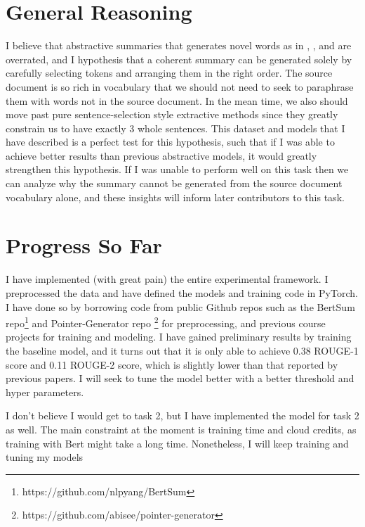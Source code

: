 \documentclass[11pt,a4paper]{article}
\begin{document}
\section{General Reasoning}
I believe that abstractive summaries that generates novel words as in \cite{pointer-generator}, \cite{lead}, and \cite{dca} are overrated, and I hypothesis that a coherent summary can be generated solely by carefully selecting tokens and arranging them in the right order. The source document is so rich in vocabulary that we should not need to seek to paraphrase them with words not in the source document. In the mean time, we also should move past pure sentence-selection style extractive methods since they greatly constrain us to have exactly 3 whole sentences. This dataset and models that I have described is a perfect test for this hypothesis, such that if I was able to achieve better results than previous abstractive models, it would greatly strengthen this hypothesis. If I was unable to perform well on this task then we can analyze why the summary cannot be generated from the source document vocabulary alone, and these insights will inform later contributors to this task.

\section{Progress So Far}
I have implemented (with great pain) the entire experimental framework. I preprocessed the data and have defined the models and training code in PyTorch. I have done so by borrowing code from public Github repos such as the BertSum repo\footnote{https://github.com/nlpyang/BertSum} and Pointer-Generator repo \footnote{https://github.com/abisee/pointer-generator} for preprocessing, and previous course projects for training and modeling. I have gained preliminary results by training the baseline model, and it turns out that it is only able to achieve 0.38 ROUGE-1 score and 0.11 ROUGE-2 score, which is slightly lower than that reported by previous papers. I will seek to tune the model better with a better threshold and hyper parameters.

I don't believe I would get to task 2, but I have implemented the model for task 2 as well. The main constraint at the moment is training time and cloud credits, as training with Bert might take a long time. Nonetheless, I will keep training and tuning my models

\newpage


\end{document}
